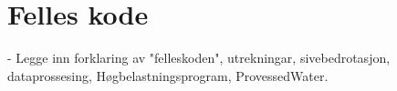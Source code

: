\section{Felles kode}
\thispagestyle{fancy}


- Legge inn forklaring av "felleskoden", utrekningar, sivebedrotasjon, dataprossesing, Høgbelastningsprogram, ProvessedWater.